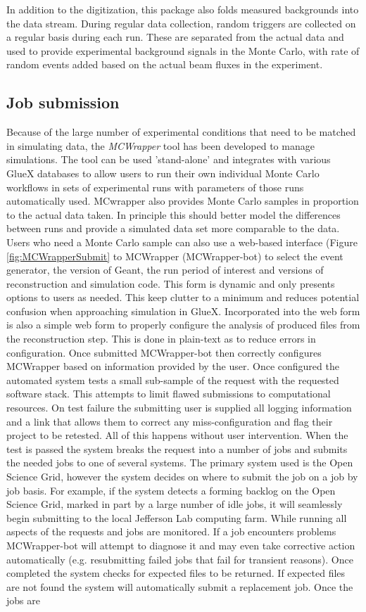 In addition to the digitization, this package also folds measured backgrounds into the data stream. During regular data collection, random triggers are collected on a regular basis during each run. These are separated from the actual data and used to provide experimental background signals in the Monte Carlo, with rate of random events added based on the actual beam fluxes in the experiment. 

\subsection{Job submission \label{sec:jobsubmission}}
Because of the large number of experimental conditions that need to be matched in simulating data, the \emph{MCWrapper} tool has been developed to manage simulations. The tool can be used 'stand-alone' and integrates with various GlueX databases to allow users to run their own individual Monte Carlo workflows in sets of experimental runs with parameters of those runs automatically used.  MCwrapper also provides Monte Carlo samples in proportion to the actual data taken.  In principle this should better model the differences between runs and provide a simulated data set more comparable to the data.  Users who need a Monte Carlo sample can also use a web-based interface (Figure \ref{fig:MCWrapperSubmit} to MCWrapper (MCWrapper-bot) to select the event generator, the version of Geant, the run period of interest and versions of reconstruction and simulation code. This form is dynamic and only presents options to users as needed.  This keep clutter to a minimum and reduces potential confusion when approaching simulation in GlueX. Incorporated into the web form is also a simple web form to properly configure the analysis of produced files from the reconstruction step.  This is done in plain-text as to reduce errors in configuration. Once submitted MCWrapper-bot then correctly configures MCWrapper based on information provided by the user.  Once configured the automated system tests a small sub-sample of the request with the requested software stack.  This attempts to limit flawed submissions to computational resources.  On test failure the submitting user is supplied all logging information and a link that allows them to correct any miss-configuration and flag their project to be retested.  All of this happens without user intervention.  When the test is passed the system breaks the request into a number of jobs and submits the needed jobs to one of several systems.  The primary system used is the Open Science Grid, however the system decides on where to submit the job on a job by job basis. For example, if the system detects a forming backlog on the Open Science Grid, marked in part by a large number of idle jobs, it will seamlessly begin submitting to the local Jefferson Lab computing farm. While running all aspects of the requests and jobs are monitored.  If a job encounters problems MCWrapper-bot will attempt to diagnose it and may even take corrective action automatically (e.g. resubmitting failed jobs that fail for transient reasons). Once completed the system checks for expected files to be returned.  If expected files are not found the system will automatically submit a replacement job. Once the jobs are 